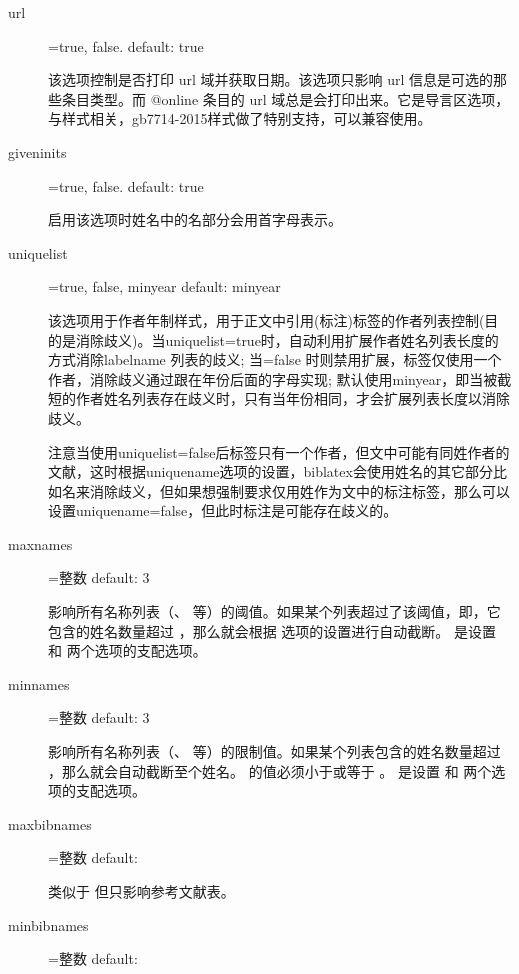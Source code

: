 \begin{description}
  \item[url]=true, false. \hfill default: true

  该选项控制是否打印 url 域并获取日期。该选项只影响 url 信息是可选的那些条目类型。而 @online 条目的 url 域总是会打印出来。它是导言区选项，与样式相关，gb7714-2015样式做了特别支持，可以兼容使用。

  \item[giveninits]=true, false. \hfill default: true

  启用该选项时姓名中的名部分会用首字母表示。

  \item[uniquelist]=true, false, minyear \hfill default: minyear

  该选项用于作者年制样式，用于正文中引用(标注)标签的作者列表控制(目的是消除歧义)。当uniquelist=true时，自动利用扩展作者姓名列表长度的方式消除labelname 列表的歧义; 当=false 时则禁用扩展，标签仅使用一个作者，消除歧义通过跟在年份后面的字母实现; 默认使用minyear，即当被截短的作者姓名列表存在歧义时，只有当年份相同，才会扩展列表长度以消除歧义。

  注意当使用uniquelist=false后标签只有一个作者，但文中可能有同姓作者的文献，这时根据uniquename选项的设置，biblatex会使用姓名的其它部分比如名来消除歧义，但如果想强制要求仅用姓作为文中的标注标签，那么可以设置uniquename=false，但此时标注是可能存在歧义的。

  \item[maxnames]=整数 \hfill default: 3

  影响所有名称列表（、 等）的阈值。如果某个列表超过了该阈值，即，它包含的姓名数量超过 ，那么就会根据  选项的设置进行自动截断。 是设置  和  两个选项的支配选项。

  \item[minnames]=整数 \hfill default: 3

  影响所有名称列表（、 等）的限制值。如果某个列表包含的姓名数量超过 ，那么就会自动截断至个姓名。 的值必须小于或等于 。 是设置  和  两个选项的支配选项。

  \item[maxbibnames]=整数 \hfill default: 

  类似于  但只影响参考文献表。

  \item[minbibnames]=整数 \hfill default: 


\end{description}
